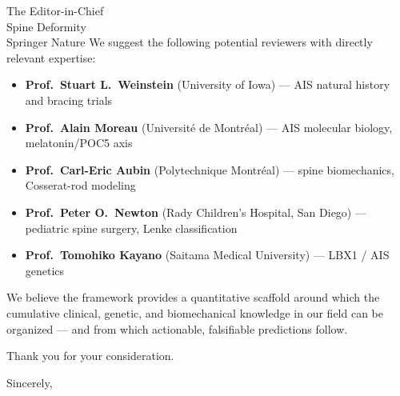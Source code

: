 \documentclass[12pt]{letter}
\begin{document}
\begin{letter}{The Editor-in-Chief\\Spine Deformity\\Springer Nature}
We suggest the following potential reviewers with directly relevant expertise:

\begin{itemize}
\item \textbf{Prof.\ Stuart L.\ Weinstein} (University of Iowa) --- AIS natural history and bracing trials
\item \textbf{Prof.\ Alain Moreau} (Universit\'{e} de Montr\'{e}al) --- AIS molecular biology, melatonin/POC5 axis
\item \textbf{Prof.\ Carl-Eric Aubin} (Polytechnique Montr\'{e}al) --- spine biomechanics, Cosserat-rod modeling
\item \textbf{Prof.\ Peter O.\ Newton} (Rady Children's Hospital, San Diego) --- pediatric spine surgery, Lenke classification
\item \textbf{Prof.\ Tomohiko Kayano} (Saitama Medical University) --- LBX1 / AIS genetics
\end{itemize}

We believe the framework provides a quantitative scaffold around which the cumulative clinical, genetic, and biomechanical knowledge in our field can be organized --- and from which actionable, falsifiable predictions follow.

Thank you for your consideration.

\closing{Sincerely,}

\end{letter}
\end{document}
